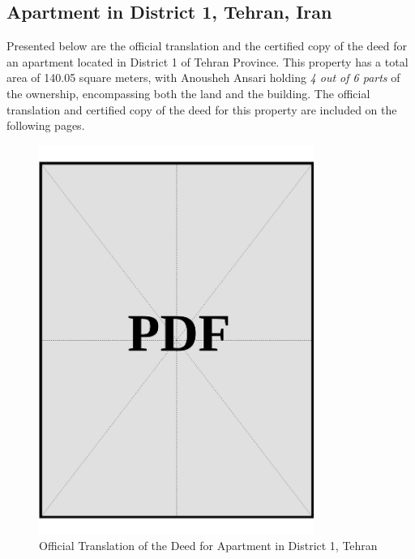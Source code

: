 \subsection{Apartment in District 1, Tehran, Iran}\label{sec:sponsor-apartment-dist1-tehran}

Presented below are the official translation and the certified copy of the deed for an apartment located in District 1 of Tehran Province. This property has a total area of 140.05 square meters, with Anousheh Ansari holding \textit{4 out of 6 parts} of the ownership, encompassing both the land and the building. The official translation and certified copy of the deed for this property are included on the following pages.


\vspace*{\fill}
\begin{figure}[h]
    \centering
    \includegraphics[page=1, width=0.8\textwidth]{../application-docs/sponsor/funds/property-deeds/property-1/official-translations.pdf}
    \caption{Official Translation of the Deed for Apartment in District 1, Tehran}
    \label{fig:sponsor-apartment-dist1-tehran-official-translation}
\end{figure}
\vspace*{\fill}

